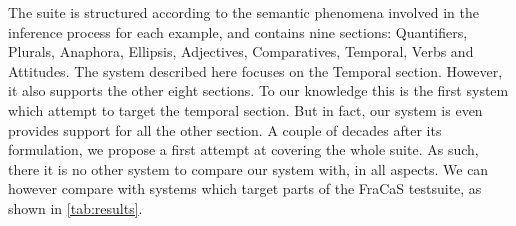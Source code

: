 \documentclass[a4paper,11pt]{article}
\begin{document}
The suite is structured according to the semantic phenomena involved
in the inference process for each example, and contains nine sections:
Quantifiers, Plurals, Anaphora, Ellipsis, Adjectives, Comparatives,
Temporal, Verbs and Attitudes.  The system described here focuses on
the Temporal section. However, it also supports the other eight
sections.  To our knowledge this is the first system which attempt to
target the temporal section. But in fact, our system is even provides
support for all the other section. A couple of decades after its
formulation, we propose a first attempt at covering the whole suite.
As such, there it is no other system to compare our system with, in
all aspects.  We can however compare with systems which target parts
of the FraCaS testsuite, as shown in \cref{tab:results}.

\providecommand\ncases[1]{{\ensuremath{^{#1}}}}
\end{document}
